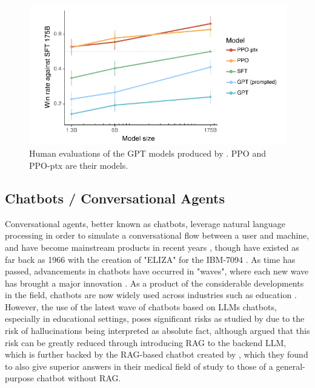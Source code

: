 \documentclass[12pt]{report}
\begin{document}
    \begin{figure}[H] 
        \centering
        \includegraphics[width=.8\linewidth]{ouyangLLMPreference.png}
        \caption{Human evaluations of the GPT models produced by \textcite{ouyang_training_2022}. PPO and PPO-ptx are their models.}
        \label{fig:LLMPref}
    \end{figure}


    \subsection{Chatbots / Conversational Agents}
    Conversational agents, better known as chatbots, leverage natural language processing in order to simulate a conversational flow 
    between a user and machine, and have become mainstream products in recent years \autocite{liao_all_2018},
    though have existed as far back as 1966 with the creation of "ELIZA" for the IBM-7094 \autocite{weizenbaum_elizacomputer_1966}.
    As time has passed, advancements in chatbots have occurred in "waves", where each new wave has brought a major innovation \autocite{schobel_charting_2024}.
    As a product of the considerable developments in the field, chatbots are now widely used 
    across industries such as education \autocite{kuhail_interacting_2023}. However, the use of the latest wave of chatbots based on LLMs
    chatbots, especially in educational settings, poses significant risks as studied by \textcite{neumann_llm-driven_2024}
    due to the risk of hallucinations being interpreted as absolute fact, although \textcite{shuster_retrieval_2021} 
    argued that this risk can be greatly reduced through introducing RAG to the backend LLM, which is further backed 
    by the RAG-based chatbot created by \textcite{ge_development_2023}, which they found to also give superior answers
    in their medical field of study to those of a general-purpose chatbot without RAG.  
\end{document}
